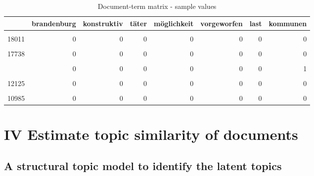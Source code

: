 \documentclass[
]{article}
\begin{document}
\begin{table}[H]

\caption{\label{tab:Document term matrix}Document-term matrix - sample values \label{table:dtm}}
\centering
\fontsize{7}{9}\selectfont
\begin{tabular}[t]{lrrrrrrr}
\toprule
  & brandenburg & konstruktiv & täter & möglichkeit & vorgeworfen & last & kommunen\\
\midrule
\cellcolor{gray!6}{37} & \cellcolor{gray!6}{1} & \cellcolor{gray!6}{0} & \cellcolor{gray!6}{0} & \cellcolor{gray!6}{0} & \cellcolor{gray!6}{2} & \cellcolor{gray!6}{0} & \cellcolor{gray!6}{0}\\
18011 & 0 & 0 & 0 & 0 & 0 & 0 & 0\\
\cellcolor{gray!6}{13723} & \cellcolor{gray!6}{0} & \cellcolor{gray!6}{0} & \cellcolor{gray!6}{0} & \cellcolor{gray!6}{0} & \cellcolor{gray!6}{0} & \cellcolor{gray!6}{0} & \cellcolor{gray!6}{0}\\
17738 & 0 & 0 & 0 & 0 & 0 & 0 & 0\\
\cellcolor{gray!6}{13859} & \cellcolor{gray!6}{0} & \cellcolor{gray!6}{0} & \cellcolor{gray!6}{0} & \cellcolor{gray!6}{0} & \cellcolor{gray!6}{0} & \cellcolor{gray!6}{0} & \cellcolor{gray!6}{0}\\
\addlinespace
547 & 0 & 0 & 0 & 0 & 0 & 0 & 1\\
\cellcolor{gray!6}{1870} & \cellcolor{gray!6}{0} & \cellcolor{gray!6}{0} & \cellcolor{gray!6}{0} & \cellcolor{gray!6}{0} & \cellcolor{gray!6}{0} & \cellcolor{gray!6}{0} & \cellcolor{gray!6}{0}\\
12125 & 0 & 0 & 0 & 0 & 0 & 0 & 0\\
\cellcolor{gray!6}{7858} & \cellcolor{gray!6}{0} & \cellcolor{gray!6}{0} & \cellcolor{gray!6}{0} & \cellcolor{gray!6}{0} & \cellcolor{gray!6}{0} & \cellcolor{gray!6}{0} & \cellcolor{gray!6}{0}\\
10985 & 0 & 0 & 0 & 0 & 0 & 0 & 0\\
\bottomrule
\end{tabular}
\end{table}

\hypertarget{iv-estimate-topic-similarity-of-documents}{%
\section{IV Estimate topic similarity of
documents}\label{iv-estimate-topic-similarity-of-documents}}

\hypertarget{a-structural-topic-model-to-identify-the-latent-topics}{%
\subsection{A structural topic model to identify the latent
topics}\label{a-structural-topic-model-to-identify-the-latent-topics}}
\end{document}
